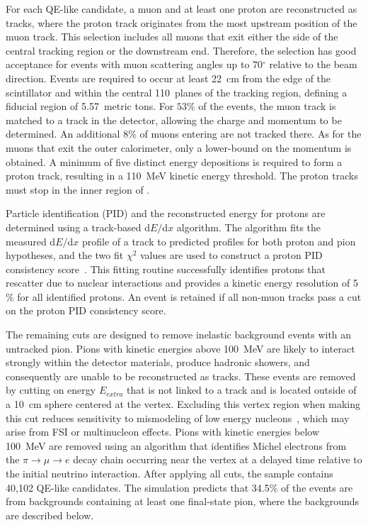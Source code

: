 
For each QE-like candidate, a muon and at least one proton are reconstructed as 
tracks, where the proton track originates from the most upstream position of 
the muon track. This selection includes all muons that exit either the side of the 
central tracking region or the downstream end. Therefore, the selection has
good acceptance for events with muon scattering angles up to 70$^{\circ}$ relative 
to the beam direction. Events are required to occur at least 22~cm from the edge 
of the scintillator and within the central 110~planes of the tracking region, defining a 
fiducial region of 5.57~metric tons. For $53\%$ of the events, the muon track 
is matched to a track in the \minos detector, allowing the charge and momentum to be 
determined. An additional $8\%$ of muons  
entering \minos are not tracked there. As for the muons that exit the 
\minerva outer calorimeter, only a lower-bound on the momentum is obtained. 
A minimum of five distinct energy depositions is required to form a 
proton track, resulting in a 110~MeV kinetic energy threshold. 
The proton tracks must stop in the inner region of \minerva. 

Particle identification (PID) and the reconstructed energy for
protons are determined using a track-based d$E/$d$x$ algorithm.
The algorithm fits the measured d$E/$d$x$ profile of 
a track to predicted profiles for both proton and pion hypotheses, 
and the two fit $\chi^2$ values are used to construct a proton PID consistency score~\cite{Twalton-thesis}. 
This fitting routine successfully identifies protons that
rescatter due to nuclear interactions and provides a kinetic energy
resolution of 5$\%$ for all identified protons. An event is retained 
if all non-muon tracks pass a cut on the proton PID consistency score.  

The remaining cuts are designed to remove inelastic background events with 
an untracked pion. Pions with kinetic energies above 100~MeV 
are likely to interact strongly within the detector materials, produce hadronic 
showers, and consequently are unable to be reconstructed as tracks. These events 
are removed by cutting on energy $E_{extra}$ that is not linked to a track and is located 
outside of a 10~cm sphere centered at the vertex. Excluding this vertex region 
when making this cut reduces sensitivity to mismodeling of low energy 
nucleons~\cite{Fields:2013zhk,Fiorentini:2013ezn}, which may arise from FSI or 
multinucleon effects.  Pions with kinetic energies below 100~MeV are removed 
using an algorithm that 
identifies Michel electrons from the $\pi \to \mu \to e$ decay chain occurring
near the vertex at a delayed time relative to the initial neutrino interaction.
After applying all cuts, the sample contains 40,102 QE-like candidates. 
The simulation predicts that 34.5\% of the events are from 
backgrounds containing at least one final-state pion, where the 
backgrounds are described below.

